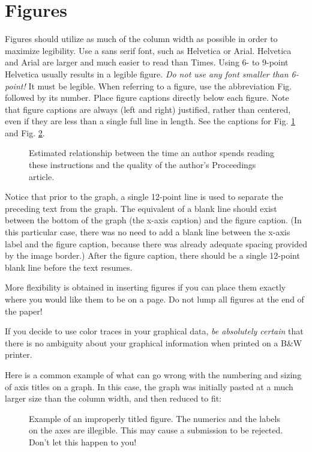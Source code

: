 \documentclass[10pt,conference,letterpaper]{RWWTemplate}
\begin{document}
\section{Figures}
Figures should utilize as much of the column width as possible in order to maximize legibility. Use a sans serif font, such as Helvetica or Arial. Helvetica and Arial are larger and much easier to read than Times. Using 6- to 9-point Helvetica usually results in a legible figure. {\it Do not use any font smaller than 6-point!} It must be legible. When referring to a figure, use the abbreviation
Fig. followed by its number. Place figure captions directly below each figure. Note that figure captions are always (left and right) justified, rather than centered, even if they are less than a single full line in length. See the captions for Fig. \ref{fig:sample_graph1} and Fig. \ref{fig:sample_graph2}.

\begin{figure}[htbp]
	\centerline{ }
	\caption{Estimated relationship between the time an author
	spends reading these instructions and the quality of the
	author's Proceedings article.}
	\label{fig:sample_graph1}
\end{figure}

Notice that prior to the graph, a single 12-point line is used to separate the preceding text from the graph. The equivalent of a blank line should exist between the bottom of the graph (the x-axis caption) and the figure caption. (In this particular case, there was no need to add a blank line between the x-axis label and the figure caption, because there was already adequate spacing provided by
the image border.) After the figure caption, there should be a single 12-point blank line before the text resumes.

More flexibility is obtained in inserting figures if you can place them exactly where you would like them to be on a page. Do not lump all figures at the end of the paper!

If you decide to use color traces in your graphical data, {\it be absolutely certain} that there is no ambiguity about your graphical information when printed on a B\&W printer.

Here is a common example of what can go wrong with the numbering and sizing of axis titles on a graph. In this case, the graph was initially pasted at a much larger size than the column width, and then reduced to fit:
\begin{figure}[htbp]
	\centerline{ }
	\caption{Example of an improperly titled figure. The numerics
	and the labels on the axes are illegible. This may cause a
	submission to be rejected. Don't let this happen to you!}
	\label{fig:sample_graph2}
\end{figure}
\end{document}

